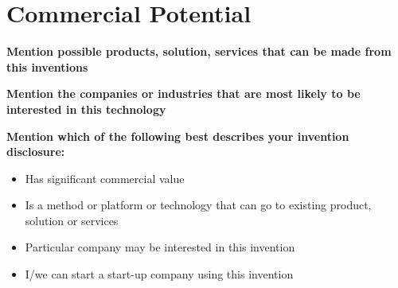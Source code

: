 \documentclass[a4paper,12pt]{article}
\begin{document}
\section*{Commercial Potential}
\textbf{Mention possible products, solution, services that can be made from this inventions}
\vspace{1cm}

\textbf{Mention the companies or industries that are most likely to be interested in this technology}
\vspace{1cm}

\textbf{Mention which of the following best describes your invention disclosure:}
\begin{itemize}[noitemsep]
    \item [$\square$] Has significant commercial value
    \item [$\square$] Is a method or platform or technology that can go to existing product, solution or services
    \item [$\square$] Particular company may be interested in this invention
    \item [$\square$] I/we can start a start-up company using this invention
\end{itemize}
\end{document}
